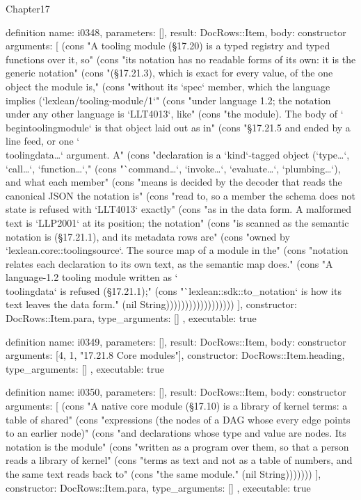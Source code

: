 \begin{lexlean}{Chapter17}
\begin{semanticmodule}
definition{
  name: i0348,
  parameters: [],
  result: DocRows::Item,
  body: constructor{
    arguments: [
      (cons "A tooling module (§17.20) is a typed registry and typed functions over it, so" (cons "its notation has no readable forms of its own: it is the generic notation" (cons "(§17.21.3), which is exact for every value, of the one object the module is," (cons "without its `spec` member, which the language implies (`lexlean/tooling-module/1`" (cons "under language 1.2; the notation under any other language is `LLT4013`, like" (cons "the module). The body of `\\begin{toolingmodule}` is that object laid out as in" (cons "§17.21.5 and ended by a line feed, or one `\\toolingdata{…}` argument. A" (cons "declaration is a `kind`-tagged object (`type{…}`, `call{…}`, `function{…}`," (cons "`command{…}`, `invoke{…}`, `evaluate{…}`, `plumbing{…}`), and what each member" (cons "means is decided by the decoder that reads the canonical JSON the notation is" (cons "read to, so a member the schema does not state is refused with `LLT4013` exactly" (cons "as in the data form. A malformed text is `LLP2001` at its position; the notation" (cons "is scanned as the semantic notation is (§17.21.1), and its metadata rows are" (cons "owned by `lexlean.core::toolingsource`. The source map of a module in the" (cons "notation relates each declaration to its own text, as the semantic map does." (cons "A language-1.2 tooling module written as `\\toolingdata` is refused (§17.21.1);" (cons "`lexlean::sdk::to_notation` is how its text leaves the data form." (nil String))))))))))))))))))
    ],
    constructor: DocRows::Item.para,
    type_arguments: []
  },
  executable: true
}

definition{
  name: i0349,
  parameters: [],
  result: DocRows::Item,
  body: constructor{
    arguments: [4, 1, "17.21.8 Core modules"],
    constructor: DocRows::Item.heading,
    type_arguments: []
  },
  executable: true
}

definition{
  name: i0350,
  parameters: [],
  result: DocRows::Item,
  body: constructor{
    arguments: [
      (cons "A native core module (§17.10) is a library of kernel terms: a table of shared" (cons "expressions (the nodes of a DAG whose every edge points to an earlier node)" (cons "and declarations whose type and value are nodes. Its notation is the module" (cons "written as a program over them, so that a person reads a library of kernel" (cons "terms as text and not as a table of numbers, and the same text reads back to" (cons "the same module." (nil String)))))))
    ],
    constructor: DocRows::Item.para,
    type_arguments: []
  },
  executable: true
}


\end{semanticmodule}
\end{lexlean}
